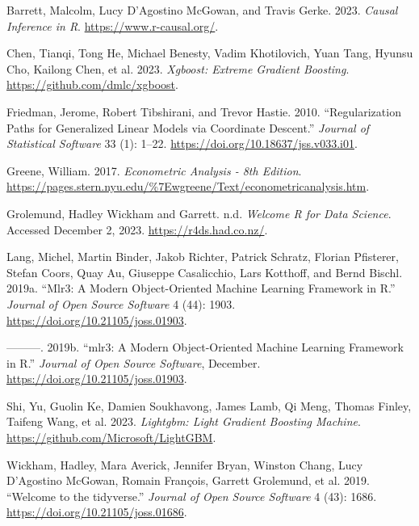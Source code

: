 \documentclass[
  letterpaper,
]{krantz}
\newlength{\cslhangindent}
\newlength{\cslentryspacingunit} %
\newenvironment{CSLReferences}[2] %
 {%
  \setlength{\parindent}{0pt}
  \ifodd #1
  \let\oldpar\par
  \def\par{\hangindent=\cslhangindent\oldpar}
  \fi
  \setlength{\parskip}{#2\cslentryspacingunit}
 }%
 {}
\begin{document}
\hypertarget{refs}{}
\begin{CSLReferences}{1}{0}
\leavevmode{}%
Barrett, Malcolm, Lucy D'Agostino McGowan, and Travis Gerke. 2023.
\emph{Causal {Inference} in {R}}. \url{https://www.r-causal.org/}.

\leavevmode{}%
Chen, Tianqi, Tong He, Michael Benesty, Vadim Khotilovich, Yuan Tang,
Hyunsu Cho, Kailong Chen, et al. 2023. \emph{Xgboost: Extreme Gradient
Boosting}. \url{https://github.com/dmlc/xgboost}.

\leavevmode{}%
Friedman, Jerome, Robert Tibshirani, and Trevor Hastie. 2010.
{``Regularization Paths for Generalized Linear Models via Coordinate
Descent.''} \emph{Journal of Statistical Software} 33 (1): 1--22.
\url{https://doi.org/10.18637/jss.v033.i01}.

\leavevmode{}%
Greene, William. 2017. \emph{Econometric {Analysis} - 8th {Edition}}.
\url{https://pages.stern.nyu.edu/%7Ewgreene/Text/econometricanalysis.htm}.

\leavevmode{}%
Grolemund, Hadley Wickham and Garrett. n.d. \emph{Welcome {\textbar} {R}
for {Data} {Science}}. Accessed December 2, 2023.
\url{https://r4ds.had.co.nz/}.

\leavevmode{}%
Lang, Michel, Martin Binder, Jakob Richter, Patrick Schratz, Florian
Pfisterer, Stefan Coors, Quay Au, Giuseppe Casalicchio, Lars Kotthoff,
and Bernd Bischl. 2019a. {``Mlr3: {A} Modern Object-Oriented Machine
Learning Framework in {R}.''} \emph{Journal of Open Source Software} 4
(44): 1903. \url{https://doi.org/10.21105/joss.01903}.

\leavevmode{}%
---------. 2019b. {``{mlr3}: A Modern Object-Oriented Machine Learning
Framework in {R}.''} \emph{Journal of Open Source Software}, December.
\url{https://doi.org/10.21105/joss.01903}.

\leavevmode{}%
Shi, Yu, Guolin Ke, Damien Soukhavong, James Lamb, Qi Meng, Thomas
Finley, Taifeng Wang, et al. 2023. \emph{Lightgbm: Light Gradient
Boosting Machine}. \url{https://github.com/Microsoft/LightGBM}.

\leavevmode{}%
Wickham, Hadley, Mara Averick, Jennifer Bryan, Winston Chang, Lucy
D'Agostino McGowan, Romain François, Garrett Grolemund, et al. 2019.
{``Welcome to the {tidyverse}.''} \emph{Journal of Open Source Software}
4 (43): 1686. \url{https://doi.org/10.21105/joss.01686}.


\end{CSLReferences}
\end{document}
